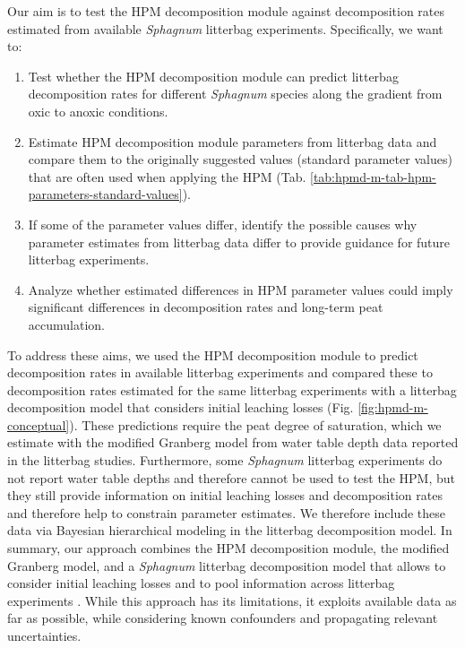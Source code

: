 \documentclass[esd, manuscript]{copernicus}
\begin{document}
Our aim is to test the HPM decomposition module against decomposition rates estimated from available \emph{Sphagnum} litterbag experiments. Specifically, we want to:

\begin{enumerate}
\def\labelenumi{\arabic{enumi}.}
\item
  Test whether the HPM decomposition module can predict litterbag decomposition rates for different \emph{Sphagnum} species along the gradient from oxic to anoxic conditions.
\item
  Estimate HPM decomposition module parameters from litterbag data and compare them to the originally suggested values (standard parameter values) \citep{Frolking.2010} that are often used when applying the HPM (Tab. \ref{tab:hpmd-m-tab-hpm-parameters-standard-values}).
\item
  If some of the parameter values differ, identify the possible causes why parameter estimates from litterbag data differ to provide guidance for future litterbag experiments.
\item
  Analyze whether estimated differences in HPM parameter values could imply significant differences in decomposition rates and long-term peat accumulation.
\end{enumerate}

To address these aims, we used the HPM decomposition module to predict decomposition rates in available litterbag experiments and compared these to decomposition rates estimated for the same litterbag experiments with a litterbag decomposition model that considers initial leaching losses \citep{Teickner.2025} (Fig. \ref{fig:hpmd-m-conceptual}). These predictions require the peat degree of saturation, which we estimate with the modified Granberg model \citep{Granberg.1999, Kettridge.2007} from water table depth data reported in the litterbag studies. Furthermore, some \emph{Sphagnum} litterbag experiments do not report water table depths and therefore cannot be used to test the HPM, but they still provide information on initial leaching losses and decomposition rates and therefore help to constrain parameter estimates. We therefore include these data via Bayesian hierarchical modeling in the litterbag decomposition model. In summary, our approach combines the HPM decomposition module, the modified Granberg model, and a \emph{Sphagnum} litterbag decomposition model that allows to consider initial leaching losses and to pool information across litterbag experiments \citep{Teickner.2025}. While this approach has its limitations, it exploits available data as far as possible, while considering known confounders and propagating relevant uncertainties.
\end{document}
